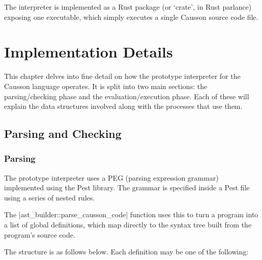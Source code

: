 \documentclass[11pt]{report}
\begin{document}
The interpreter is implemented as a Rust package (or `crate', in Rust parlance) exposing one executable, which simply executes a single Causson source code file.

\chapter{Implementation Details} \label{chapImpl}

This chapter delves into fine detail on how the prototype interpreter for the Causson language operates. It is split into two main sections: the parsing/checking phase and the evaluation/execution phase. Each of these will explain the data structures involved along with the processes that use them.

\section{Parsing and Checking}

\subsection{Parsing} \label{secParsing}

The prototype interpreter uses a PEG (parsing expression grammar) implemented using the Pest library. The grammar is specified inside a Pest file using a series of nested rules.

The |ast_builder::parse_causson_code| function uses this to turn a program into a list of global definitions, which map directly to the syntax tree built from the program's source code.

The structure is as follows below. Each definition may be one of the following:
\end{document}
